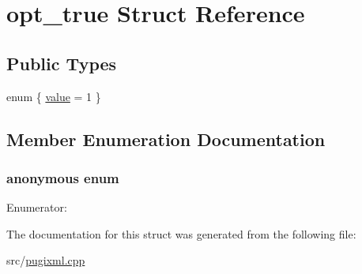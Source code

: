 \hypertarget{structopt__true}{
\section{opt\_\-true Struct Reference}
\label{structopt__true}
}
\subsection*{Public Types}
\begin{DoxyCompactItemize}
\item 
enum \{ \hyperlink{structopt__true_a93a7039f202aca3a935c98aa8e069ea5a3f8405655cc98a5710236f177e042b72}{value} =  1
 \}
\end{DoxyCompactItemize}


\subsection{Member Enumeration Documentation}
\hypertarget{structopt__true_a93a7039f202aca3a935c98aa8e069ea5}{
\subsubsection[{"@1}]{\setlength{\rightskip}{0pt plus 5cm}anonymous enum}}
\label{structopt__true_a93a7039f202aca3a935c98aa8e069ea5}
\begin{Desc}
\item[Enumerator: ]\par
\begin{description}
\item[{\em 
\hypertarget{structopt__true_a93a7039f202aca3a935c98aa8e069ea5a3f8405655cc98a5710236f177e042b72}{
value}
\label{structopt__true_a93a7039f202aca3a935c98aa8e069ea5a3f8405655cc98a5710236f177e042b72}
}]\end{description}
\end{Desc}



The documentation for this struct was generated from the following file:\begin{DoxyCompactItemize}
\item 
src/\hyperlink{pugixml_8cpp}{pugixml.cpp}\end{DoxyCompactItemize}
